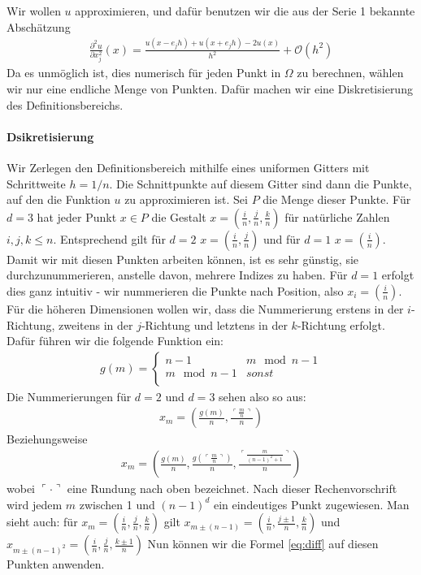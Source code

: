 \documentclass[smallheadings]{scrartcl}
\begin{document}
Wir wollen $u$ approximieren, und dafür benutzen wir die aus der Serie 1 bekannte Abschätzung
\begin{align}
\frac{\partial^2 u}{\partial x_j^2}(x)=\frac{u(x-e_jh)+u(x+e_jh)-2u(x)}{h^2}+\mathcal{O}(h^2)
\label{eq:diff}
\end{align} 
Da es unmöglich ist, dies numerisch für jeden Punkt in $\Omega$ zu berechnen, wählen wir nur eine endliche Menge von Punkten. Dafür machen wir eine Diskretisierung des Definitionsbereichs. 

\paragraph{ Dsikretisierung}

Wir Zerlegen den Definitionsbereich mithilfe eines uniformen Gitters mit Schrittweite $h = 1/n$. Die Schnittpunkte auf diesem Gitter sind dann die Punkte, auf den die Funktion $u$ zu approximieren ist. Sei $P$ die Menge dieser Punkte. Für $d=3$ hat jeder Punkt $x\in P$ die Gestalt $x = (\frac{i}{n}, \frac{j}{n}, \frac{k}{n})$ für natürliche Zahlen $i, j, k \leq n$. Entsprechend gilt für $d=2$ $x=(\frac{i}{n}, \frac{j}{n})$ und für $d=1$ $x=(\frac{i}{n})$.
Damit wir mit diesen Punkten arbeiten können, ist es sehr günstig, sie durchzunummerieren, anstelle davon, mehrere Indizes zu haben. Für $d=1$ erfolgt dies ganz intuitiv - wir nummerieren die Punkte nach Position, also $x_i = (\frac{i}{n})$. Für die höheren Dimensionen wollen wir, dass die Nummerierung erstens in der $i$-Richtung, zweitens in der $j$-Richtung und letztens in der $k$-Richtung erfolgt. Dafür führen wir die folgende Funktion ein:
\begin{align}
g(m)=
\begin{cases} 
n-1 &m\mod{n-1} \\
m\mod{n-1} & sonst \\
\end{cases}
\end{align}
Die Nummerierungen für $d=2$ und $d=3$ sehen also so aus: 
\begin{align}
x_m=(\frac{g(m)}{n},\frac{\ulcorner\frac{m}{n}\urcorner}{n} ) 
\end{align}
Beziehungsweise
\begin{align}
x_m=(\frac{g(m)}{n}, \frac{g(\ulcorner\frac{m}{n}\urcorner)}{n}, \frac{\ulcorner\frac{m}{(n-1)^2+1}\urcorner}{n}) 
\end{align}
wobei $\ulcorner \cdot \urcorner$ eine Rundung nach oben bezeichnet. Nach dieser Rechenvorschrift wird jedem $m$ zwischen 1 und $(n-1)^d$ ein eindeutiges Punkt zugewiesen. Man sieht auch: für $x_m = (\frac{i}{n}, \frac{j}{n}, \frac{k}{n})$ gilt $x_{m\pm(n-1)} = (\frac{i}{n}, \frac{j\pm1}{n}, \frac{k}{n})$ und $x_{m\pm(n-1)^2} = (\frac{i}{n}, \frac{j}{n}, \frac{k\pm1}{n})$
 Nun können wir die Formel \eqref{eq:diff} auf diesen Punkten anwenden.
\end{document}
